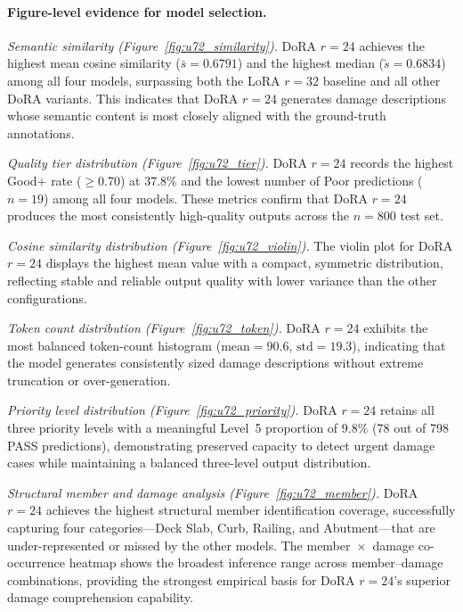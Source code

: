 \documentclass[onecolumn]{article}
\begin{document}
\paragraph{Figure-level evidence for model selection.}
\textit{Semantic similarity (Figure~\ref{fig:u72_similarity}).}
DoRA $r{=}24$ achieves the highest mean cosine similarity
($\bar{s}=0.6791$) and the highest median
($\tilde{s}=0.6834$) among all four models,
surpassing both the LoRA $r{=}32$ baseline and all other DoRA variants.
This indicates that DoRA $r{=}24$ generates damage descriptions whose semantic
content is most closely aligned with the ground-truth annotations.

\textit{Quality tier distribution (Figure~\ref{fig:u72_tier}).}
DoRA $r{=}24$ records the highest Good$+$ rate ($\geq$0.70) at $37.8\%$
and the lowest number of Poor predictions ($n{=}19$) among all four models.
These metrics confirm that DoRA $r{=}24$ produces the most consistently
high-quality outputs across the $n{=}800$ test set.

\textit{Cosine similarity distribution (Figure~\ref{fig:u72_violin}).}
The violin plot for DoRA $r{=}24$ displays the highest mean value with
a compact, symmetric distribution, reflecting stable and reliable output
quality with lower variance than the other configurations.

\textit{Token count distribution (Figure~\ref{fig:u72_token}).}
DoRA $r{=}24$ exhibits the most balanced token-count histogram
($\mathrm{mean}=90.6$, $\mathrm{std}=19.3$), indicating that the model
generates consistently sized damage descriptions without extreme truncation
or over-generation.

\textit{Priority level distribution (Figure~\ref{fig:u72_priority}).}
DoRA $r{=}24$ retains all three priority levels with a meaningful Level~5
proportion of $9.8\%$ (78 out of 798 PASS predictions), demonstrating
preserved capacity to detect urgent damage cases while maintaining a
balanced three-level output distribution.

\textit{Structural member and damage analysis (Figure~\ref{fig:u72_member}).}
DoRA $r{=}24$ achieves the highest structural member identification coverage,
successfully capturing four categories---Deck Slab, Curb, Railing, and
Abutment---that are under-represented or missed by the other models.
The member~$\times$~damage co-occurrence heatmap shows the broadest
inference range across member--damage combinations, providing the strongest
empirical basis for DoRA $r{=}24$'s superior damage comprehension capability.
\end{document}
